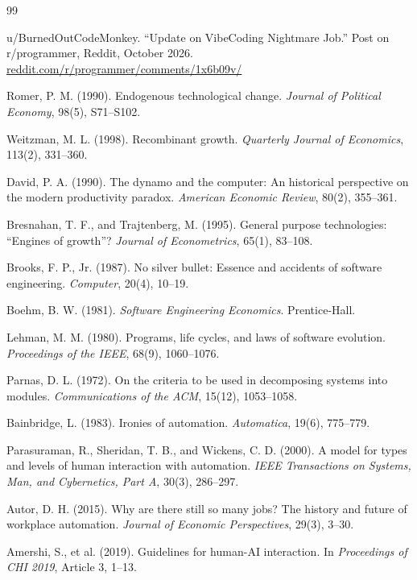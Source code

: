\documentclass[11pt]{article}
\theoremstyle{remark}
\begin{document}
\begin{thebibliography}{99}

 u/BurnedOutCodeMonkey. ``Update on VibeCoding Nightmare Job.'' Post on r/programmer, Reddit, October 2026. \url{reddit.com/r/programmer/comments/1x6b09v/}

 Romer, P. M. (1990). Endogenous technological change. \emph{Journal of Political Economy}, 98(5), S71--S102.

 Weitzman, M. L. (1998). Recombinant growth. \emph{Quarterly Journal of Economics}, 113(2), 331--360.

 David, P. A. (1990). The dynamo and the computer: An historical perspective on the modern productivity paradox. \emph{American Economic Review}, 80(2), 355--361.

 Bresnahan, T. F., and Trajtenberg, M. (1995). General purpose technologies: ``Engines of growth''? \emph{Journal of Econometrics}, 65(1), 83--108.

 Brooks, F. P., Jr. (1987). No silver bullet: Essence and accidents of software engineering. \emph{Computer}, 20(4), 10--19.

 Boehm, B. W. (1981). \emph{Software Engineering Economics}. Prentice-Hall.

 Lehman, M. M. (1980). Programs, life cycles, and laws of software evolution. \emph{Proceedings of the IEEE}, 68(9), 1060--1076.

 Parnas, D. L. (1972). On the criteria to be used in decomposing systems into modules. \emph{Communications of the ACM}, 15(12), 1053--1058.

 Bainbridge, L. (1983). Ironies of automation. \emph{Automatica}, 19(6), 775--779.

 Parasuraman, R., Sheridan, T. B., and Wickens, C. D. (2000). A model for types and levels of human interaction with automation. \emph{IEEE Transactions on Systems, Man, and Cybernetics, Part A}, 30(3), 286--297.

 Autor, D. H. (2015). Why are there still so many jobs? The history and future of workplace automation. \emph{Journal of Economic Perspectives}, 29(3), 3--30.

 Amershi, S., et al. (2019). Guidelines for human-AI interaction. In \emph{Proceedings of CHI 2019}, Article 3, 1--13.


\end{thebibliography}
\end{document}
